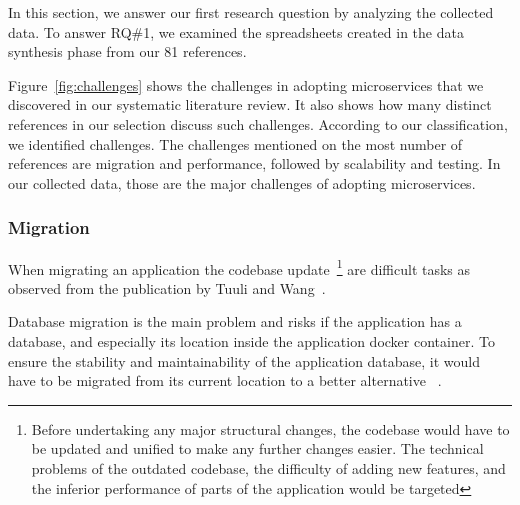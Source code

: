 In this section, we answer our first research question by analyzing the collected data.
To answer RQ\#1, we examined the spreadsheets created in the data synthesis phase from our 81 references.

Figure~\ref{fig:challenges} shows the challenges in adopting microservices that we discovered in our systematic literature review. It also shows how many distinct references in our selection discuss such challenges. 
According to our classification, we identified \challengecount challenges.
The challenges mentioned on the most number of references are migration and performance, followed by scalability and testing. In our collected data, those are the major challenges of adopting microservices.


\subsubsection{Migration}%
When migrating an application the {codebase update~\footnote{Before undertaking any major structural changes, the codebase would have to be updated and unified to make any further changes easier. The technical problems of the outdated codebase, the difficulty of adding new features, and the inferior performance of parts of the application would be targeted}} are difficult tasks as observed from the publication by Tuuli and Wang~\cite{Tuuli2020, wang2020}. 

Database migration is the main problem and risks if the application has a database, and especially its location inside the application docker container. To ensure the stability and maintainability of the application database, it would have to be migrated from its current location to a better alternative ~\cite{Tuuli2020}.

